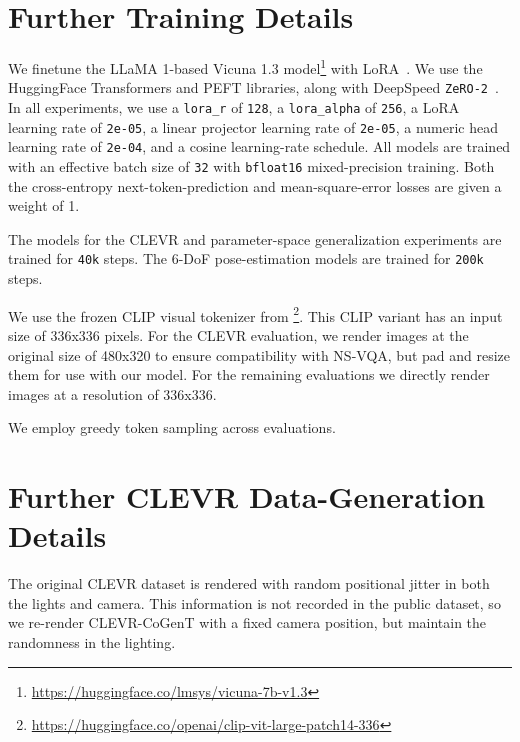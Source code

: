 \clearpage
\appendix
\renewcommand{\thefigure}{S.\arabic{figure}}
\renewcommand{\thetable}{S.\arabic{table}}
\renewcommand{\theequation}{S.\arabic{equation}}
\setcounter{figure}{0}
\setcounter{table}{0}
\setcounter{equation}{0}

\section{Further Training Details}\label{sec:further_training_details}
We finetune the LLaMA 1-based Vicuna 1.3 model\footnote{\url{https://huggingface.co/lmsys/vicuna-7b-v1.3}} with LoRA~\citep{hu2022lora}.
We use the HuggingFace Transformers and PEFT libraries, along with DeepSpeed \mbox{\texttt{ZeRO-2}}~\citep{zero}.
In all experiments, we use a \mbox{\texttt{lora\_r}} of \mbox{\texttt{128}}, a \mbox{\texttt{lora\_alpha}} of \mbox{\texttt{256}}, a LoRA learning rate of \mbox{\texttt{2e-05}}, a linear projector learning rate of \mbox{\texttt{2e-05}}, a numeric head learning rate of \mbox{\texttt{2e-04}}, and a cosine learning-rate schedule.
All models are trained with an effective batch size of \mbox{\texttt{32}} with \mbox{\texttt{bfloat16}} mixed-precision training.
Both the cross-entropy next-token-prediction and mean-square-error losses are given a weight of 1.

The models for the CLEVR and parameter-space generalization experiments are trained for \mbox{\texttt{40k}} steps.
The 6-DoF pose-estimation models are trained for \mbox{\texttt{200k}} steps.

We use the frozen CLIP visual tokenizer from \footnote{\url{https://huggingface.co/openai/clip-vit-large-patch14-336}}.
This CLIP variant has an input size of 336x336 pixels.
For the CLEVR evaluation, we render images at the original size of 480x320 to ensure compatibility with NS-VQA, but pad and resize them for use with our model.
For the remaining evaluations we directly render images at a resolution of 336x336.

We employ greedy token sampling across evaluations.

\section{Further CLEVR Data-Generation Details}
The original CLEVR dataset is rendered with random positional jitter in both the lights and camera.
This information is not recorded in the public dataset, so we re-render CLEVR-CoGenT with a fixed camera position, but maintain the randomness in the lighting.

